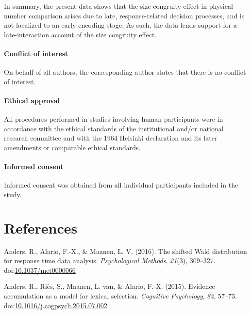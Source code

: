 \documentclass[english,,man]{apa6}
\let\oldparagraph\paragraph
\renewcommand{\paragraph}[1]{\oldparagraph{#1}\mbox{}}
\theoremstyle{definition}
\theoremstyle{definition}
\theoremstyle{definition}
\theoremstyle{remark}
\begin{document}
In summary, the present data shows that the size congruity effect in
physical number comparison arises due to late, response-related decision
processes, and is not localized to an early encoding stage. As such, the
data lends support for a late-interaction account of the size congruity
effect.

\hypertarget{conflict-of-interest}{%
\paragraph{Conflict of interest}\label{conflict-of-interest}}

On behalf of all authors, the corresponding author states that there is
no conflict of interest.

\hypertarget{ethical-approval}{%
\paragraph{Ethical approval}\label{ethical-approval}}

All procedures performed in studies involving human participants were in
accordance with the ethical standards of the institutional and/or
national research committee and with the 1964 Helsinki declaration and
its later amendments or comparable ethical standards.

\hypertarget{informed-consent}{%
\paragraph{Informed consent}\label{informed-consent}}

Informed consent was obtained from all individual participants included
in the study.

\newpage

\hypertarget{references}{%
\section{References}\label{references}}

\setlength{\parindent}{-0.5in}
\setlength{\leftskip}{0.5in}

\hypertarget{refs}{}
\leavevmode\hypertarget{ref-anders2016}{}%
Anders, R., Alario, F.-X., \& Maanen, L. V. (2016). The shifted Wald
distribution for response time data analysis. \emph{Psychological
Methods}, \emph{21}(3), 309--327.
doi:\href{https://doi.org/10.1037/met0000066}{10.1037/met0000066}

\leavevmode\hypertarget{ref-anders2015}{}%
Anders, R., Riès, S., Maanen, L. van, \& Alario, F.-X. (2015). Evidence
accumulation as a model for lexical selection. \emph{Cognitive
Psychology}, \emph{82}, 57--73.
doi:\href{https://doi.org/10.1016/j.cogpsych.2015.07.002}{10.1016/j.cogpsych.2015.07.002}
\end{document}
